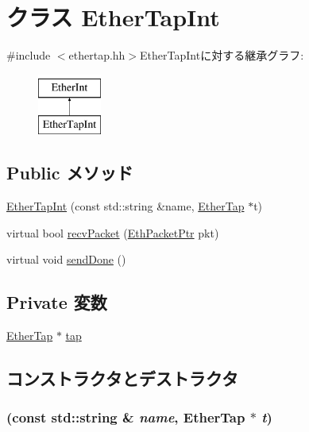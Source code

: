 \hypertarget{classEtherTapInt}{
\section{クラス EtherTapInt}
\label{classEtherTapInt}
}


{\ttfamily \#include $<$ethertap.hh$>$}EtherTapIntに対する継承グラフ:\begin{figure}[H]
\begin{center}
\leavevmode
\includegraphics[height=2cm]{classEtherTapInt}
\end{center}
\end{figure}
\subsection*{Public メソッド}
\begin{DoxyCompactItemize}
\item 
\hyperlink{classEtherTapInt_a57593be078f266a6304e0f55d0144746}{EtherTapInt} (const std::string \&name, \hyperlink{classEtherTap}{EtherTap} $\ast$t)
\item 
virtual bool \hyperlink{classEtherTapInt_a9bd96a108d6f58f140c9f7d83726eebe}{recvPacket} (\hyperlink{classRefCountingPtr}{EthPacketPtr} pkt)
\item 
virtual void \hyperlink{classEtherTapInt_a967489e0b2900f4b12d99e6257d24dbe}{sendDone} ()
\end{DoxyCompactItemize}
\subsection*{Private 変数}
\begin{DoxyCompactItemize}
\item 
\hyperlink{classEtherTap}{EtherTap} $\ast$ \hyperlink{classEtherTapInt_afceac4e4f9153ef0f38b7c423422dd2e}{tap}
\end{DoxyCompactItemize}


\subsection{コンストラクタとデストラクタ}
\hypertarget{classEtherTapInt_a57593be078f266a6304e0f55d0144746}{
\subsubsection[{EtherTapInt}]{ (const std::string \& {\em name}, \/  {\bf EtherTap} $\ast$ {\em t})}}
\label{classEtherTapInt_a57593be078f266a6304e0f55d0144746}



